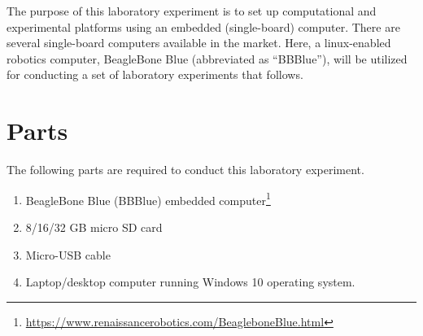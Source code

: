 
The purpose of this laboratory experiment is to set up computational and experimental
platforms using an embedded (single-board) computer. There are
several single-board computers available in the market. Here, a linux-enabled
robotics computer, BeagleBone Blue (abbreviated as ``BBBlue''), will be utilized for conducting a set of laboratory
experiments that follows.

\section{Parts}
\label{sec:partsNeeded}
The following parts are required to conduct this laboratory experiment. %
%
\begin{enumerate}
\item BeagleBone Blue (BBBlue) embedded computer\footnote{\href{https://www.renaissancerobotics.com/BeagleboneBlue.html}{https://www.renaissancerobotics.com/BeagleboneBlue.html}}
\item 8/16/32 GB micro SD card
\item Micro-USB cable 
\item Laptop/desktop computer running Windows 10 operating system. 
\end{enumerate}


